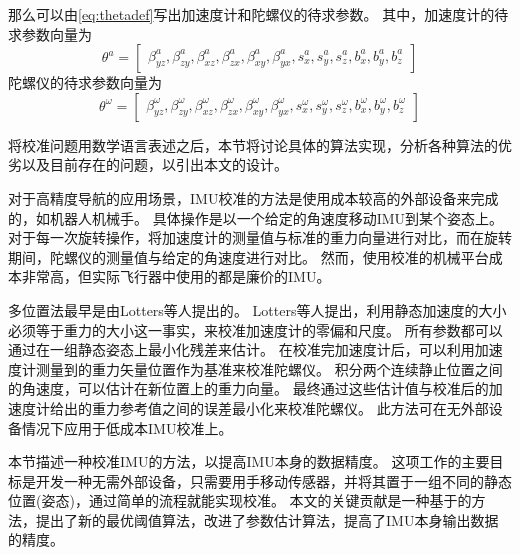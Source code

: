 \documentclass[
  type=master
]{gdutthesis}
\begin{document}
那么可以由\autoref{eq:thetadef}写出加速度计和陀螺仪的待求参数。
其中，加速度计的待求参数向量为
\begin{equation}
	\theta^a = 
	\begin{bmatrix}
		\beta_{yz}^a,\beta_{zy}^a,\beta_{xz}^a,\beta_{zx}^a,\beta_{xy}^a, \beta_{yx}^a,s_x^a,s_y^a,s_z^a,b_x^a,b_y^a,b_z^a
	\end{bmatrix}
\end{equation}
陀螺仪的待求参数向量为
\begin{equation}
	\theta^\omega = 
	\begin{bmatrix}
		\beta_{yz}^\omega,\beta_{zy}^\omega,\beta_{xz}^\omega,\beta_{zx}^\omega,\beta_{xy}^\omega, \beta_{yx}^\omega,s_x^\omega,s_y^\omega,s_z^\omega,b_x^\omega,b_y^\omega,b_z^\omega
	\end{bmatrix}
\end{equation}

将校准问题用数学语言表述之后，本节将讨论具体的算法实现，分析各种算法的优劣以及目前存在的问题，以引出本文的设计。

对于高精度导航的应用场景，IMU校准的方法是使用成本较高的外部设备来完成的，如机器人机械手。
具体操作是以一个给定的角速度移动IMU到某个姿态上\cite{hall2000case}。
对于每一次旋转操作，将加速度计的测量值与标准的重力向量进行对比，而在旋转期间，陀螺仪的测量值与给定的角速度进行对比。
然而，使用校准的机械平台成本非常高，但实际飞行器中使用的都是廉价的IMU。


多位置法最早是由Lotters等人提出的\cite{lotters1998procedure}。
Lotters等人提出，利用静态加速度的大小必须等于重力的大小这一事实，来校准加速度计的零偏和尺度。
所有参数都可以通过在一组静态姿态上最小化残差来估计。
在校准完加速度计后，可以利用加速度计测量到的重力矢量位置作为基准来校准陀螺仪。
积分两个连续静止位置之间的角速度，可以估计在新位置上的重力向量。
最终通过这些估计值与校准后的加速度计给出的重力参考值之间的误差最小化来校准陀螺仪。
此方法可在无外部设备情况下应用于低成本IMU校准上。

本节描述一种校准IMU的方法，以提高IMU本身的数据精度。
这项工作的主要目标是开发一种无需外部设备，只需要用手移动传感器，并将其置于一组不同的静态位置(姿态)，通过简单的流程就能实现校准。
本文的关键贡献是一种基于\parencite{tedaldi2014robust}的方法，提出了新的最优阈值算法，改进了参数估计算法，提高了IMU本身输出数据的精度。
\end{document}
